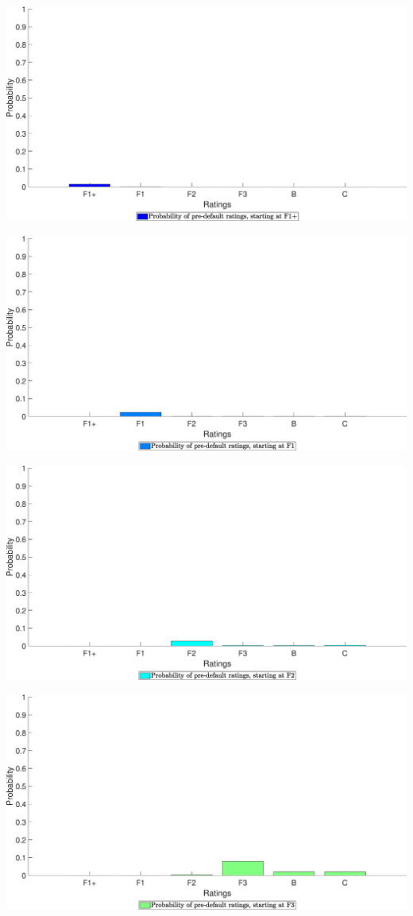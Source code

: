 \begin{landscape}
\includegraphics[width=.95\columnwidth]{PrePDQ/PrePDQ_FOBB_1}
\end{landscape}
\begin{landscape}
\includegraphics[width=.95\columnwidth]{PrePDQ/PrePDQ_FOBB_2}
\end{landscape}
\begin{landscape}
\includegraphics[width=.95\columnwidth]{PrePDQ/PrePDQ_FOBB_3}
\end{landscape}
\begin{landscape}
\includegraphics[width=.95\columnwidth]{PrePDQ/PrePDQ_FOBB_4}
\end{landscape}
